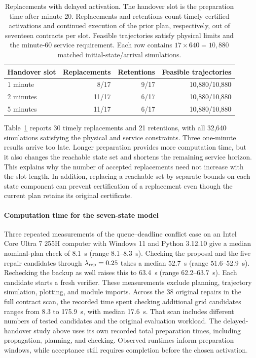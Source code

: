 \documentclass[preprint,12pt]{elsarticle}
\theoremstyle{definition}
\theoremstyle{plain}
\theoremstyle{definition}
\theoremstyle{plain}
\begin{document}
\begin{table}[!htbp]
\centering\small
\setlength{\belowcaptionskip}{6pt}
\caption{Replacements with delayed activation. The handover slot is the
preparation time after minute 20. Replacements and retentions count timely
certified activations and continued execution of the prior plan,
respectively, out of seventeen contracts per slot. Feasible trajectories
satisfy physical limits and the minute-60 service requirement. Each row
contains $17\times640=10{,}880$ matched initial-state/arrival simulations.}
\label{tab:delayed-handover}
\setlength{\tabcolsep}{4pt}
\begin{tabular}{@{}lrrr@{}}
\toprule
Handover slot & Replacements & Retentions & Feasible trajectories\\
\midrule
1 minute & 8/17 & 9/17 & 10,880/10,880\\
2 minutes & 11/17 & 6/17 & 10,880/10,880\\
5 minutes & 11/17 & 6/17 & 10,880/10,880\\
\bottomrule
\end{tabular}
\end{table}

Table~\ref{tab:delayed-handover} reports 30 timely replacements and
21 retentions, with all 32,640 simulations satisfying the physical and service
constraints. Three one-minute results arrive too late. Longer preparation
provides more computation time, but it also changes the reachable state
set and shortens the remaining service horizon. This explains why the
number of accepted replacements need not increase with the slot length.
In addition, replacing a reachable set by separate bounds on each state component can prevent
certification of a replacement even though the current plan retains its
original certificate.

\paragraph{Computation time for the seven-state model}
Three repeated measurements of the queue--deadline conflict case on an
Intel Core Ultra 7 255H computer with Windows 11 and Python 3.12.10 give
a median nominal-plan check of 8.1~s (range 8.1--8.3~s).
Checking the proposal and the five repair candidates through
$\lambda_{\rm rep}=0.25$ takes a median 52.7~s (range 51.6--52.9~s).
Rechecking the backup as well raises this to 63.4~s (range 62.2--63.7~s).
Each candidate starts a fresh verifier. These measurements exclude
planning, trajectory simulation, plotting, and module imports. Across the
38 original repairs in the full contract scan, the recorded time spent
checking additional grid candidates ranges from 8.3 to 175.9~s, with
median 17.6~s. That scan includes different numbers of tested candidates
and the original evaluation workload. The delayed-handover study above
uses its own recorded total preparation times, including propagation,
planning, and checking. Observed runtimes inform preparation windows,
while acceptance still requires completion before the chosen activation.
\end{document}
